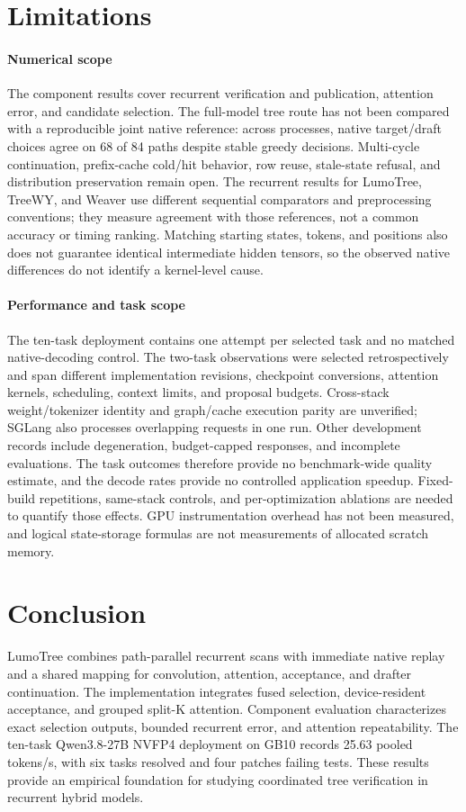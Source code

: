 \documentclass[conference]{IEEEtran}
\newcommand{\sys}{LumoTree}
\begin{document}
\section{Limitations}
\label{sec:limitations}
\paragraph{Numerical scope}
The component results cover recurrent verification and publication, attention error, and candidate selection. The full-model tree route has not been compared with a reproducible joint native reference: across processes, native target/draft choices agree on 68 of 84 paths despite stable greedy decisions. Multi-cycle continuation, prefix-cache cold/hit behavior, row reuse, stale-state refusal, and distribution preservation remain open. The recurrent results for \sys{}, TreeWY, and Weaver use different sequential comparators and preprocessing conventions; they measure agreement with those references, not a common accuracy or timing ranking. Matching starting states, tokens, and positions also does not guarantee identical intermediate hidden tensors, so the observed native differences do not identify a kernel-level cause.

\paragraph{Performance and task scope}
The ten-task deployment contains one attempt per selected task and no matched native-decoding control. The two-task observations were selected retrospectively and span different implementation revisions, checkpoint conversions, attention kernels, scheduling, context limits, and proposal budgets. Cross-stack weight/tokenizer identity and graph/cache execution parity are unverified; SGLang also processes overlapping requests in one run. Other development records include degeneration, budget-capped responses, and incomplete evaluations. The task outcomes therefore provide no benchmark-wide quality estimate, and the decode rates provide no controlled application speedup. Fixed-build repetitions, same-stack controls, and per-optimization ablations are needed to quantify those effects. GPU instrumentation overhead has not been measured, and logical state-storage formulas are not measurements of allocated scratch memory.

\section{Conclusion}
\sys{} combines path-parallel recurrent scans with immediate native replay and a shared mapping for convolution, attention, acceptance, and drafter continuation. The implementation integrates fused selection, device-resident acceptance, and grouped split-K attention. Component evaluation characterizes exact selection outputs, bounded recurrent error, and attention repeatability. The ten-task Qwen3.8-27B NVFP4 deployment on GB10 records 25.63 pooled tokens/s, with six tasks resolved and four patches failing tests. These results provide an empirical foundation for studying coordinated tree verification in recurrent hybrid models.
\end{document}
